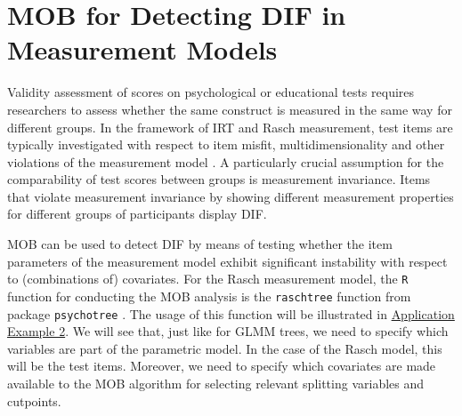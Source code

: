 \documentclass[doc,floatsintext,natbib]{apa7}
\begin{document}
\section{MOB for Detecting DIF in Measurement Models}
\label{raschtree}

Validity assessment of scores on psychological or educational tests requires researchers to assess whether the same construct is measured in the same way for different groups. In the framework of IRT and Rasch measurement, test items are typically investigated with respect to item misfit, multidimensionality and other violations of the measurement model \citep[cf., for example][for an introduction]{DebStrZei:2022:CRC}. A particularly crucial assumption for the comparability of test scores between groups is measurement invariance. Items that violate measurement invariance by showing different measurement properties for different groups of participants display DIF.

MOB can be used to detect DIF by means of testing whether the item parameters of the measurement model exhibit significant instability with respect to (combinations of) covariates. For the Rasch measurement model, the \texttt{R} function for conducting the MOB analysis is the \texttt{raschtree} function from package \texttt{psychotree} \citep{StroyKopf15}. The usage of this function will be illustrated in \hyperref[sec:TutorialRasch]{Application Example 2}. We will see that, just like for GLMM trees, we need to specify which variables are part of the parametric model. In the case of the Rasch model, this will be the test items. Moreover, we need to specify which covariates are made available to the MOB algorithm for selecting relevant splitting variables and cutpoints. 
\end{document}
